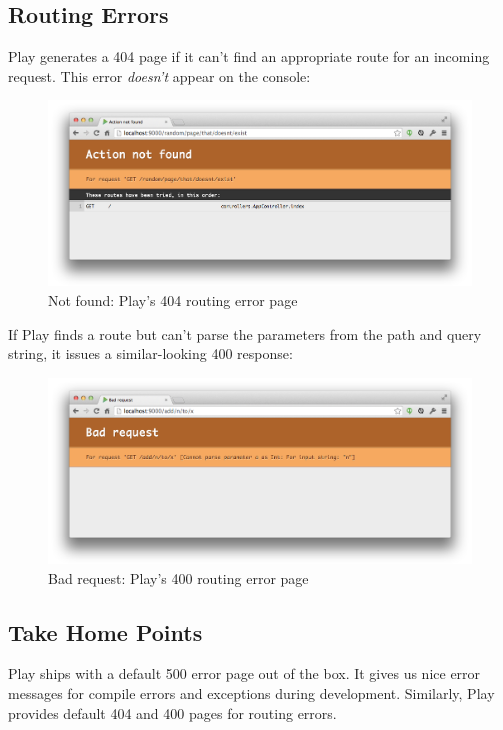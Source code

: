 \documentclass[oneside,11pt,a4paper,]{book}
\begin{document}
\subsection{Routing Errors}\label{routing-errors}

Play generates a 404 page if it can't find an appropriate route for an
incoming request. This error \emph{doesn't} appear on the console:

\begin{figure}[htbp]
\centering
\includegraphics{src/pages/basics/not-found-error.png}
\caption{Not found: Play's 404 routing error page}
\end{figure}

If Play finds a route but can't parse the parameters from the path and
query string, it issues a similar-looking 400 response:

\begin{figure}[htbp]
\centering
\includegraphics{src/pages/basics/bad-request-error.png}
\caption{Bad request: Play's 400 routing error page}
\end{figure}

\subsection{Take Home Points}\label{take-home-points-4}

Play ships with a default 500 error page out of the box. It gives us
nice error messages for compile errors and exceptions during
development. Similarly, Play provides default 404 and 400 pages for
routing errors.
\end{document}
